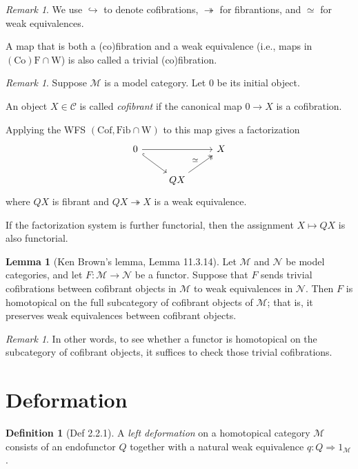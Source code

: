 \documentclass[11pt]{article}
\theoremstyle{definition}
\newtheorem{lemma}[theorem]{Lemma}
\newtheorem{definition}[theorem]{Definition}
\theoremstyle{remark}
\newtheorem{remark}[theorem]{Remark}
\newcommand{\calM}{\mathcal{M}}
\begin{document}
\begin{remark}
    We use $\hookrightarrow$ to denote cofibrations, $\twoheadrightarrow$ for fibrantions,
    and $\simeq$ for weak equivalences.

    A map that is both a (co)fibration and a weak equivalence (i.e., maps in $\mathrm{(Co)F} \cap \mathrm{W}$)
    is also called a trivial (co)fibration. 
\end{remark}

\begin{remark}\label{cofibrant-replacement}
    Suppose $\calM$ is a model category. Let $0$ be its initial object.

    An object $X \in \mathcal{C}$ is called \emph{cofibrant} if the canonical map 
    $0 \longrightarrow X$ is a cofibration.

    Applying the WFS $(\mathrm{Cof}, \mathrm{Fib} \cap \mathrm{W})$ to this map gives a factorization
    \[
    \begin{tikzcd}
        0 \arrow[rr] \arrow[dr, hookrightarrow] & & X \\
        & QX \arrow[ur, twoheadrightarrow, "\simeq"] &
    \end{tikzcd}
    \]
    where $QX$ is fibrant and $QX \twoheadrightarrow X$ is a weak equivalence.

    If the factorization system is further functorial, then the assignment $X \mapsto QX$ is also functorial.
\end{remark}

\begin{lemma}[Ken Brown's lemma, Lemma 11.3.14]\label{Ken-Brown}
    Let $\mathcal{M}$ and $\mathcal{N}$ be model categories, and let 
    $F : \mathcal{M} \longrightarrow \mathcal{N}$
    be a functor. Suppose that $F$ sends trivial cofibrations between cofibrant objects in
    $\mathcal{M}$ to weak equivalences in $\mathcal{N}$.  
    Then $F$ is homotopical on the full subcategory of cofibrant objects of $\mathcal{M}$;
    that is, it preserves weak equivalences between cofibrant objects.
\end{lemma}

\begin{remark}
    In other words, to see whether a functor is homotopical on the subcategory of cofibrant objects,
    it suffices to check those trivial cofibrations.
\end{remark}

\section{Deformation}
\begin{definition}[Def 2.2.1]
    A \emph{left deformation} on a homotopical category $\calM$
    consists of an endofunctor $Q$ together with a natural weak equivalence
    $q : Q \Rightarrow 1_{\calM}$. 
\end{definition}
\end{document}
